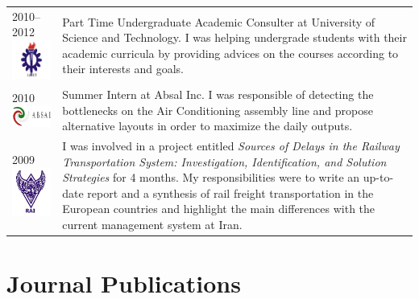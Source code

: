 \documentclass[10PT,letter]{article}
\newcommand{\numbox}[1]{} %
\begin{document}
\begin{tabular}{p{1.2in}p{5.55in}}
						\textsc{2010--2012}\vspace{1mm}\newline \includegraphics[width=1.5cm]{static/logos/IUST} &
										Part Time Undergraduate Academic Consulter  at University of Science and Technology. 
										I was helping undergrade students with their academic curricula by providing advices on the courses according to their interests and goals. \\[3mm]
										
						\textsc{2010}\vspace{1mm}\newline \includegraphics[width=1.95cm]{static/logos/ABSAL} &
										Summer Intern  at Absal Inc. 
										I was responsible of detecting the bottlenecks on the Air Conditioning assembly  line and propose alternative  layouts in order to maximize the daily outputs. \\[3mm]
						
						\textsc{2009} \vspace{1mm} \newline \includegraphics[width=1.4cm]{static/logos/RAI} & 
										I was involved in a project entitled \textit{Sources of Delays in the Railway Transportation System: Investigation, Identification, and Solution Strategies} for 4 months. My responsibilities were to write an up-to-date  report and a synthesis of rail freight transportation in the European countries and highlight the main differences with the current management system at Iran.  

						
			\end{tabular}

            

\section*{\numbox{3}\bfseries\textcolor{titlecol}{\sffamily Journal Publications }}       
\end{document}
